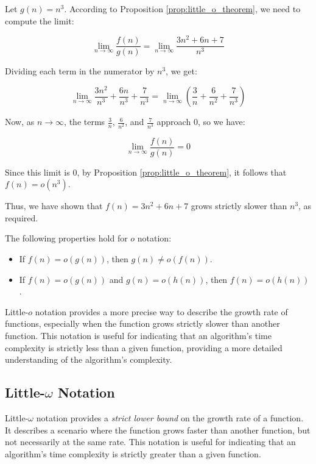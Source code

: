 \begin{solution}
    
    Let \( g(n) = n^3 \). According to Proposition \ref{prop:little_o_theorem}, we need to compute the limit:
    
    \[
    \lim_{n \to \infty} \frac{f(n)}{g(n)} = \lim_{n \to \infty} \frac{3n^2 + 6n + 7}{n^3}
    \]
    
    Dividing each term in the numerator by \( n^3 \), we get:
    
    \[
    \lim_{n \to \infty} \frac{3n^2}{n^3} + \frac{6n}{n^3} + \frac{7}{n^3} = \lim_{n \to \infty} \left( \frac{3}{n} + \frac{6}{n^2} + \frac{7}{n^3} \right)
    \]
    
    Now, as \( n \to \infty \), the terms \( \frac{3}{n} \), \( \frac{6}{n^2} \), and \( \frac{7}{n^3} \) approach \( 0 \), so we have:
    
    \[
    \lim_{n \to \infty} \frac{f(n)}{g(n)} = 0
    \]
    
    Since this limit is \( 0 \), by Proposition \ref{prop:little_o_theorem}, it follows that \( f(n) = o(n^3) \).
    
    Thus, we have shown that \( f(n) = 3n^2 + 6n + 7 \) grows strictly slower than \( n^3 \), as required.
\end{solution}

The following properties hold for $o$ notation:
\begin{itemize}
    \item If $f(n) = o(g(n))$, then $g(n) \neq o(f(n))$.
    \item If $f(n) = o(g(n))$ and $g(n) = o(h(n))$, then $f(n) = o(h(n))$.
\end{itemize}

Little-$o$ notation provides a more precise way to describe the growth rate of functions, especially when the function grows strictly slower than another function. This notation is useful for indicating that an algorithm's time complexity is strictly less than a given function, providing a more detailed understanding of the algorithm's complexity.

\subsection*{Little-\texorpdfstring{$\omega$}{omega} Notation}
Little-$\omega$ notation provides a \textit{strict lower bound} on the growth rate of a function. It describes a scenario where the function grows faster than another function, but not necessarily at the same rate. This notation is useful for indicating that an algorithm's time complexity is strictly greater than a given function.

